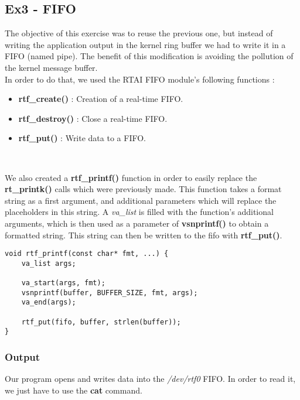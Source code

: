 \subsection{Ex3 - FIFO}

The objective of this exercise was to reuse the previous one, but instead of writing the application output in the kernel ring buffer we had to write it in a FIFO (named pipe). The benefit of this modification is avoiding the pollution of the kernel message buffer.\\

\noindent In order to do that, we used the RTAI FIFO module's following functions :
\begin{itemize}
    \item \textbf{rtf\_create()} : Creation of a real-time FIFO.
    \item \textbf{rtf\_destroy()} : Close a real-time FIFO.
    \item \textbf{rtf\_put()} : Write data to a FIFO.
\end{itemize}
\

We also created a \textbf{rtf\_printf()} function in order to easily replace the \textbf{rt\_printk()} calls which were previously made. This function takes a format string as a first argument, and additional parameters which will replace the placeholders in this string. A \emph{va\_list} is filled with the function's additional arguments, which is then used as a parameter of \textbf{vsnprintf()} to obtain a formatted string. This string can then be written to the fifo with \textbf{rtf\_put()}.\\

\begin{lstlisting}[caption={rtf\_printf}]
void rtf_printf(const char* fmt, ...) {
	va_list args;

	va_start(args, fmt);
	vsnprintf(buffer, BUFFER_SIZE, fmt, args);
	va_end(args);

	rtf_put(fifo, buffer, strlen(buffer));
}
\end{lstlisting}

\subsubsection{Output}
Our program opens and writes data into the \emph{/dev/rtf0} FIFO. In order to read it, we just have to use the \textbf{cat} command.\\

